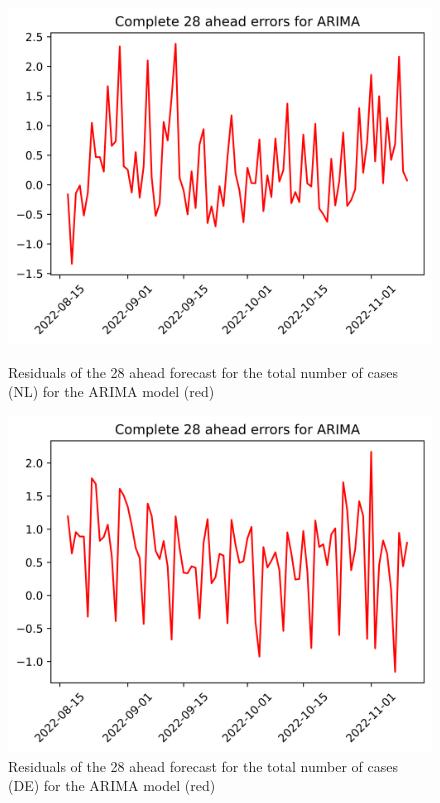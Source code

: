 \begin{figure}

\begin{minipage}{.45\textwidth}
  \centering
  \includegraphics[width=\linewidth]{pics/28_ah/28_ahead_errors_ARIMA.png}
  \caption{Residuals of the 28 ahead forecast for the total number of cases (NL) for the ARIMA model (red)}
  \label{fig:tot_cases_error_28_ARIMA}
\end{minipage}
\begin{minipage}{.45\textwidth}
  \centering
  \includegraphics[width=\linewidth]{pics/28_ah/DE_28_ahead_errors_ARIMA.png}
  \caption{Residuals of the 28 ahead forecast for the total number of cases (DE) for the ARIMA model (red)}
  \label{fig:tot_cases_error_28_ARIMA_DE}
\end{minipage}

\end{figure}
